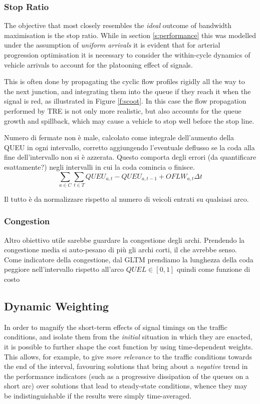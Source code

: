 \subsubsection{Stop Ratio}
The objective that most closely resembles the \emph{ideal} outcome of bandwidth maximisation is the stop ratio. While in section \ref{s:performance} this was modelled under the assumption of \emph{uniform arrivals} it is evident that for arterial progression optimisation it is necessary to consider the within-cycle dynamics of vehicle arrivals to account for the platooning effect of signals.

This is often done by propagating the cyclic flow profiles rigidly all the way to the next junction, and integrating them into the queue if they reach it when the signal is red, as illustrated in Figure \ref{f:scoot}. In this case the flow propagation performed by TRE is not only more realistic, but also accounts for the queue growth and spillback, which may cause a vehicle to stop well before the stop line.

Numero di fermate non è male, calcolato come integrale dell'aumento della QUEU in ogni intervallo, corretto aggiungendo l'eventuale deflusso se la coda alla fine dell'intervallo non si è azzerata.
Questo comporta degli errori (da quantificare esattamente?) negli intervalli in cui la coda comincia o finisce.
$$
\sum_{a \in C} \sum_{t \in T} QUEU_{a,t} - QUEU_{a,t-1} + OFLW_{a,t} \Delta t
$$

Il tutto è da normalizzare rispetto al numero di veicoli entrati su qualsiasi arco.


\subsubsection{Congestion}

Altro obiettivo utile sarebbe guardare la congestione degli archi.
Prendendo la congestione media si auto-pesano di più gli archi corti, il che avrebbe senso.
Come indicatore della congestione, dal GLTM prendiamo la lunghezza della coda peggiore nell'intervallo rispetto all'arco $QUEL\in[0,1]$ quindi come funzione di costo


\subsection{Dynamic Weighting}
In order to magnify the short-term effects of signal timings on the traffic conditions, and isolate them from the \emph{initial} situation in which they are enacted, it is possible to further shape the cost function by using time-dependent weights. This allows, for example, to give \emph{more relevance} to the traffic conditions towards the end of the interval, favouring solutions that bring about a \emph{negative} trend in the performance indicators (such as a progressive dissipation of the queues on a short arc) over solutions that lead to steady-state conditions, whence they may be indistinguishable if the results were simply time-averaged.

